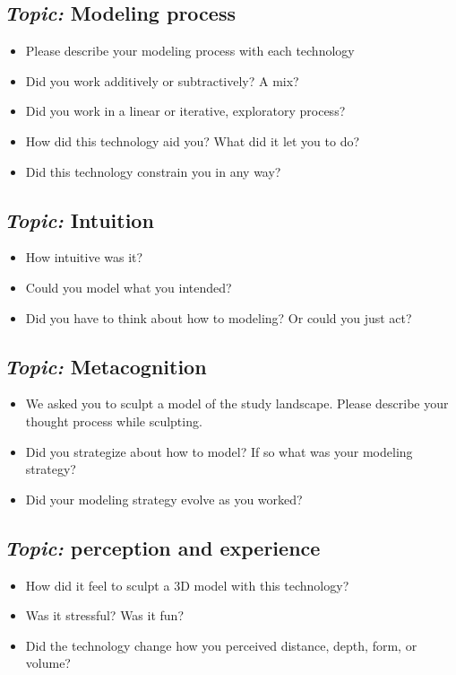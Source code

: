 \documentclass[prodmode,acmtochi]{acmsmall} %
\begin{document}
\subsection{\emph{Topic:} Modeling process}
\begin{itemize}
\item Please describe your modeling process with each technology
\item Did you work additively or subtractively? A mix?
\item Did you work in a linear or iterative, exploratory process?
\item How did this technology aid you? What did it let you to do?
\item Did this technology constrain you in any way?
\end{itemize}
\vspace*{0.5em}

\subsection{\emph{Topic:} Intuition}
\begin{itemize}
\item How intuitive was it? 
\item Could you model what you intended?
\item Did you have to think about how to modeling? Or could you just act?
\end{itemize}
\vspace*{0.5em}

\subsection{\emph{Topic:} Metacognition}
\begin{itemize}
\item We asked you to sculpt a model of the study landscape. Please describe your thought process while sculpting. 
\item Did you strategize about how to model? If so what was your modeling strategy? 
\item Did your modeling strategy evolve as you worked?
\end{itemize}
\vspace*{0.5em}

\subsection{\emph{Topic:} perception and experience}
\begin{itemize}
\item How did it feel to sculpt a 3D model with this technology?
\item Was it stressful? Was it fun?
\item Did the technology change how you perceived distance, depth, form, or volume?  
\end{itemize}
\end{document}
